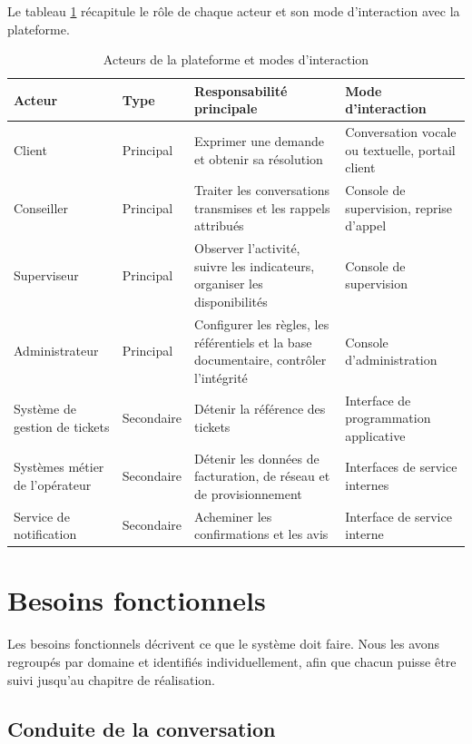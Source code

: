 Le tableau \ref{tab:acteurs} récapitule le rôle de chaque acteur et son mode d'interaction avec la plateforme.

\begin{table}[H]
\centering
\renewcommand{\arraystretch}{1.25}
\begin{tabular}{|p{2.6cm}|p{2.2cm}|p{4.4cm}|p{4.6cm}|}
\hline
\textbf{Acteur} & \textbf{Type} & \textbf{Responsabilité principale} & \textbf{Mode d'interaction} \\
\hline
Client & Principal & Exprimer une demande et obtenir sa résolution & Conversation vocale ou textuelle, portail client \\
\hline
Conseiller & Principal & Traiter les conversations transmises et les rappels attribués & Console de supervision, reprise d'appel \\
\hline
Superviseur & Principal & Observer l'activité, suivre les indicateurs, organiser les disponibilités & Console de supervision \\
\hline
Administrateur & Principal & Configurer les règles, les référentiels et la base documentaire, contrôler l'intégrité & Console d'administration \\
\hline
Système de gestion de tickets & Secondaire & Détenir la référence des tickets & Interface de programmation applicative \\
\hline
Systèmes métier de l'opérateur & Secondaire & Détenir les données de facturation, de réseau et de provisionnement & Interfaces de service internes \\
\hline
Service de notification & Secondaire & Acheminer les confirmations et les avis & Interface de service interne \\
\hline
\end{tabular}
\caption{Acteurs de la plateforme et modes d'interaction}
\label{tab:acteurs}
\end{table}

\section{Besoins fonctionnels}

Les besoins fonctionnels décrivent ce que le système doit faire. Nous les avons regroupés par domaine et identifiés individuellement, afin que chacun puisse être suivi jusqu'au chapitre de réalisation.

\subsection{Conduite de la conversation}

